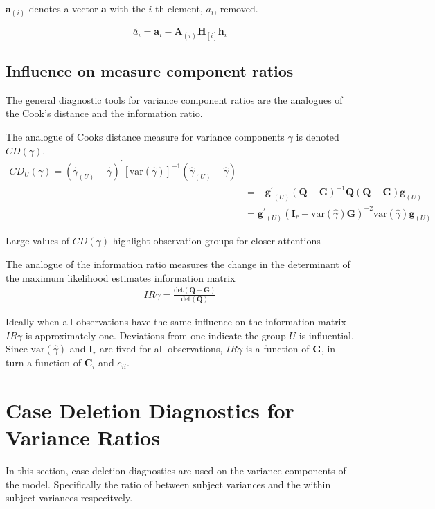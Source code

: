 \documentclass[12pt, a4paper]{report}
\theoremstyle{plain}
\theoremstyle{definition}
\theoremstyle{remark}
\begin{document}
	$\boldsymbol{a}_{(i)}$ denotes a vector $\boldsymbol{a}$ with the $i$-th element, $a_{i}$, removed.
	
	\begin{equation}
	\breve{a_{i}} =  \boldsymbol{a}_{i} -
	\boldsymbol{A}_{(i)}\boldsymbol{H}_{[i]}\boldsymbol{h}_{i}
	\end{equation}
	
	\subsection{Influence on measure component ratios}               %
	The general diagnostic tools for variance component ratios are the analogues of the Cook's distance and the information ratio.
	
	The analogue of Cooks distance measure for variance components $\gamma$ is denoted $CD(\gamma)$.
	\begin{eqnarray*}
		CD_{U}(\gamma) = (\hat{\gamma}_{(U)} - \hat{\gamma})^{\prime}[\mbox{var}(\hat{\gamma})]^{-1}(\hat{\gamma}_{(U)} - \hat{\gamma})\\
		&= -\boldsymbol{g^{\prime}}_{(U)} (\boldsymbol{Q}-\boldsymbol{G})^{-1}\boldsymbol{Q}(\boldsymbol{Q}-\boldsymbol{G})\boldsymbol{g}_{(U)} \\
		&= \boldsymbol{g^{\prime}}_{(U)} (\boldsymbol{I}_{r} + \mbox{var}(\hat{\gamma})\boldsymbol{G})^{-2}\mbox{var}(\hat{\gamma})\boldsymbol{g}_{(U)}
	\end{eqnarray*}
	
	Large values of $CD(\gamma)$ highlight observation groups for closer attentions
	
	The analogue of the information ratio measures the change in the determinant of the maximum likelihood estimates information matrix
	\begin{eqnarray*}
		IR{\gamma}  = \frac{\mbox{det}(\boldsymbol{Q} - \boldsymbol{G})}{\mbox{det}(\boldsymbol{Q})}
	\end{eqnarray*}
	
	Ideally when all observations have the same influence on the information matrix $IR{\gamma}$ is approximately one.
	Deviations from one indicate the group $U$ is influential. Since $\mbox{var}(\hat{\gamma})$ and $\boldsymbol{I}_{r}$ are fixed for all observations, $IR{\gamma}$ is a function of $\boldsymbol{G}$, in turn a function of $\boldsymbol{C}_{i}$ and $c_{ii}$.
	
	\section{Case Deletion Diagnostics for Variance Ratios}
	In this section, case deletion diagnostics are used on the variance components of the model. Specifically the ratio of between subject variances and the within subject variances respecitvely.
	
\end{document}
